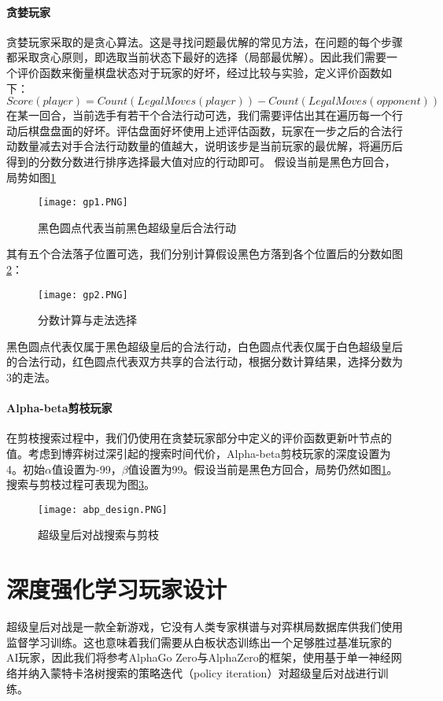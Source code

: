 \paragraph{贪婪玩家}
贪婪玩家采取的是贪心算法\cite{introAlgo}。这是寻找问题最优解的常见方法，在问题的每个步骤都采取贪心原则，即选取当前状态下最好的选择（局部最优解）。因此我们需要一个评价函数来衡量棋盘状态对于玩家的好坏，经过比较与实验，定义评价函数如下：
\begin{equation}
    Score(player) = Count(LegalMoves(player)) - Count(LegalMoves(opponent))
\end{equation}
在某一回合，当前选手有若干个合法行动可选，我们需要评估出其在遍历每一个行动后棋盘盘面的好坏。评估盘面好坏使用上述评估函数，玩家在一步之后的合法行动数量减去对手合法行动数量的值越大，说明该步是当前玩家的最优解，将遍历后得到的分数分数进行排序选择最大值对应的行动即可。
假设当前是黑色方回合，局势如图\ref{fig:gp1}
\begin{figure}[H]
    \centering
    \texttt{[image: gp1.PNG]}
    \caption[gp1]{%
        黑色圆点代表当前黑色超级皇后合法行动%
      }
    \label{fig:gp1}
\end{figure}
其有五个合法落子位置可选，我们分别计算假设黑色方落到各个位置后的分数如图\ref{fig:gp2}：
\begin{figure}[H]
    \centering
    \texttt{[image: gp2.PNG]}
    \caption[gp2]{%
        分数计算与走法选择%
      }
    \label{fig:gp2}
\end{figure}
黑色圆点代表仅属于黑色超级皇后的合法行动，白色圆点代表仅属于白色超级皇后的合法行动，红色圆点代表双方共享的合法行动，根据分数计算结果，选择分数为3的走法。
\paragraph{Alpha-beta剪枝玩家}
在剪枝搜索过程中，我们仍使用在贪婪玩家部分中定义的评价函数更新叶节点的值。考虑到博弈树过深引起的搜索时间代价\cite{sstextbook}，Alpha-beta剪枝玩家的深度设置为4。初始$\alpha$值设置为-99，$\beta$值设置为99。假设当前是黑色方回合，局势仍然如图\ref{fig:gp1}。搜索与剪枝过程可表现为图\ref{fig:abpde}。
\begin{figure}[H]
    \centering
    \texttt{[image: abp\_design.PNG]}
    \caption[abpde]{%
        超级皇后对战搜索与剪枝%
      }
    \label{fig:abpde}
\end{figure}

\section{深度强化学习玩家设计}
超级皇后对战是一款全新游戏，它没有人类专家棋谱与对弈棋局数据库供我们使用监督学习训练。这也意味着我们需要从白板状态训练出一个足够胜过基准玩家的AI玩家，因此我们将参考AlphaGo Zero与AlphaZero的框架，使用基于单一神经网络并纳入蒙特卡洛树搜索的策略迭代（policy iteration）对超级皇后对战进行训练\cite{Silver1140,Silver2017,Silver2016}。

